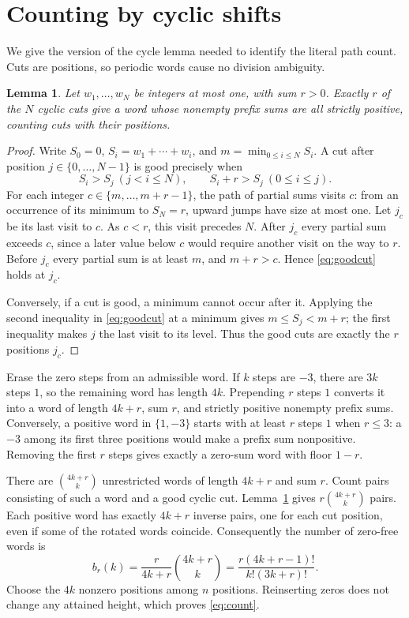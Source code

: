 \documentclass[11pt]{article}
\newtheorem{lemma}[theorem]{Lemma}
\begin{document}
\section{Counting by cyclic shifts}
We give the version of the cycle lemma needed to identify the literal path
count. Cuts are positions, so periodic words cause no division ambiguity.

\begin{lemma}\label{lem:cycle}
Let $w_1,\ldots,w_N$ be integers at most one, with sum $r>0$.
Exactly $r$ of the $N$ cyclic cuts give a word whose nonempty prefix sums
are all strictly positive, counting cuts with their positions.
\end{lemma}
\begin{proof}
Write $S_0=0$, $S_i=w_1+\cdots+w_i$, and $m=\min_{0\leq i\leq N}S_i$.
A cut after position $j\in\{0,\ldots,N-1\}$ is good precisely when
\begin{equation}\label{eq:goodcut}
 S_i>S_j\ (j<i\leq N),\qquad S_i+r>S_j\ (0\leq i\leq j).
\end{equation}
For each integer $c\in\{m,\ldots,m+r-1\}$, the path of partial sums
visits $c$: from an occurrence of its minimum to $S_N=r$, upward jumps
have size at most one. Let $j_c$ be its last visit to $c$.
As $c<r$, this visit precedes $N$. After $j_c$ every partial sum exceeds
$c$, since a later value below $c$ would require another visit on the way
to $r$. Before $j_c$ every partial sum is at least $m$, and
$m+r>c$. Hence \eqref{eq:goodcut} holds at $j_c$.

Conversely, if a cut is good, a minimum cannot occur after it. Applying
the second inequality in \eqref{eq:goodcut} at a minimum gives
$m\leq S_j<m+r$; the first inequality makes $j$ the last visit to its
level. Thus the good cuts are exactly the $r$ positions $j_c$.
\end{proof}

Erase the zero steps from an admissible word. If $k$ steps are $-3$,
there are $3k$ steps $1$, so the remaining word has length $4k$.
Prepending $r$ steps $1$ converts it into a word of length $4k+r$,
sum $r$, and strictly positive nonempty prefix sums.
Conversely, a positive word in $\{1,-3\}$ starts with at least $r$
steps $1$ when $r\leq3$: a $-3$ among its first three positions would
make a prefix sum nonpositive. Removing the first $r$ steps gives
exactly a zero-sum word with floor $1-r$.

There are $\binom{4k+r}{k}$ unrestricted words of length $4k+r$ and
sum $r$. Count pairs consisting of such a word and a good cyclic cut.
Lemma~\ref{lem:cycle} gives $r\binom{4k+r}{k}$ pairs. Each positive word
has exactly $4k+r$ inverse pairs, one for each cut position, even if
some of the rotated words coincide. Consequently the number of zero-free
words is
\begin{equation}\label{eq:b}
 b_r(k)=\frac{r}{4k+r}\binom{4k+r}{k}
       =\frac{r(4k+r-1)!}{k!(3k+r)!}.
\end{equation}
Choose the $4k$ nonzero positions among $n$ positions. Reinserting zeros
does not change any attained height, which proves \eqref{eq:count}.
\end{document}
